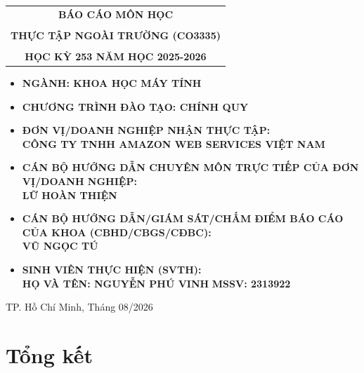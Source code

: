 \documentclass[a4paper]{article}
\theoremstyle{definition}
\begin{document}
\begin{titlepage}
\begin{center}
\begin{tabular}{c}
\multicolumn{1}{c}{\textbf{{\LARGE BÁO CÁO MÔN HỌC}}}\\
\\{\textbf{{\LARGE THỰC TẬP NGOÀI TRƯỜNG (CO3335)}}}
\\
\\
\textbf{\Large HỌC KỲ 253 NĂM HỌC 2025-2026} \\
\end{tabular}
\end{center}
\vspace{0.5cm}
\begin{itemize}
\renewcommand\labelitemi{--}
    \item \Large \textbf{NGÀNH: KHOA HỌC MÁY TÍNH}
    \item \Large \textbf{CHƯƠNG TRÌNH ĐÀO TẠO: CHÍNH QUY}
\end{itemize}
\vspace{0.7cm}
\begin{itemize}
\renewcommand\labelitemi{--}
    \item \Large \textbf{ĐƠN VỊ/DOANH NGHIỆP NHẬN THỰC TẬP:}
    \\ \Large \textbf{CÔNG TY TNHH AMAZON WEB SERVICES VIỆT NAM}
    \item \Large \textbf{CÁN BỘ HƯỚNG DẪN CHUYÊN MÔN TRỰC TIẾP CỦA ĐƠN VỊ/DOANH NGHIỆP:}
    \\ \Large \textbf{LỮ HOÀN THIỆN}
    \item \Large \textbf{CÁN BỘ HƯỚNG DẪN/GIÁM SÁT/CHẤM ĐIỂM BÁO CÁO CỦA KHOA (CBHD/CBGS/CĐBC):}
    \\ \Large \textbf{VŨ NGỌC TÚ}
    \item \Large \textbf{SINH VIÊN THỰC HIỆN (SVTH):}
    \\ \Large \textbf{HỌ VÀ TÊN: NGUYỄN PHÚ VINH} \textbf{MSSV: 2313922}
\end{itemize}
\vspace{0.5cm}
\begin{center}
{\Large TP. Hồ Chí Minh, Tháng 08/2026}
\end{center}
\end{titlepage}

\newpage
\tableofcontents
\newpage





\newpage
\section{Tổng kết}
\end{document}

